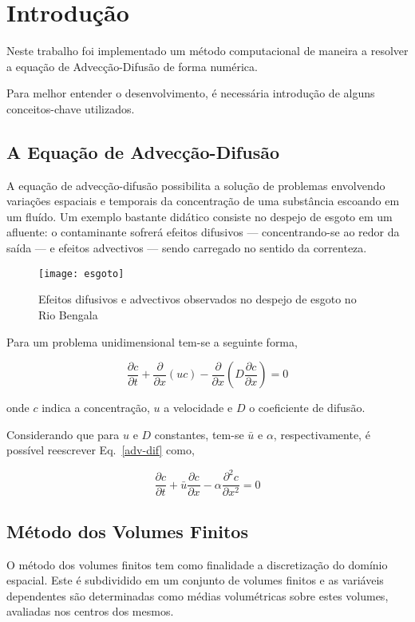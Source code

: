 \chapter{Introdução}
Neste trabalho foi implementado um método computacional de maneira a resolver
a equação de Advecção-Difusão de forma numérica.

Para melhor entender o desenvolvimento, é necessária introdução de alguns
conceitos-chave utilizados.

\section{A Equação de Advecção-Difusão}
A equação de advecção-difusão possibilita a solução de problemas envolvendo
variações espaciais e temporais da concentração de uma substância escoando em um
fluído. Um exemplo bastante didático consiste no despejo de esgoto em um
afluente: o contaminante sofrerá efeitos difusivos --- concentrando-se ao redor
da saída --- e efeitos advectivos --- sendo carregado no sentido da correnteza.

\begin{figure}[h]
    \centering
    \captionsetup{justification=centering}
    \texttt{[image: esgoto]}
    \caption{Efeitos difusivos e advectivos observados no despejo de esgoto no
    Rio Bengala}
\end{figure}


Para um problema unidimensional tem-se a seguinte forma,

\begin{equation}\label{adv-dif}
    \frac{\partial c}{\partial t} + \frac{\partial}{\partial x}(uc)
    - \frac{\partial}{\partial x}\left( D \frac{\partial c}{\partial x} \right)
    = 0
\end{equation}

\noindent onde $c$ indica a concentração, $u$ a velocidade e $D$ o coeficiente
de difusão.

Considerando que para $u$ e $D$ constantes, tem-se $\bar{u}$ e $\alpha$,
respectivamente, é possível reescrever Eq.\ \ref{adv-dif} como,

\begin{equation}
    \frac{\partial c}{\partial t} + \bar{u}\frac{\partial c}{\partial x} -
    \alpha\frac{\partial^2 c}{\partial x^2} = 0
\end{equation}

\section{Método dos Volumes Finitos}
O método dos volumes finitos tem como finalidade a discretização do domínio
espacial. Este é subdividido em um conjunto de volumes finitos e as variáveis
dependentes são determinadas como médias volumétricas sobre estes volumes,
avaliadas nos centros dos mesmos.

